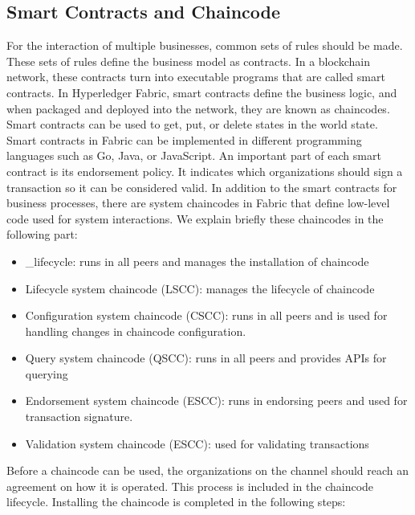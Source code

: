 \documentclass[sigconf,natbib=false]{acmart}
\begin{document}
    \subsection{Smart Contracts and Chaincode}
    For the interaction of multiple businesses, common sets of rules should be made. These sets of rules define the business model as contracts. In a blockchain network, these contracts turn into executable programs that are called smart contracts.
    In Hyperledger Fabric, smart contracts define the business logic, and when packaged and deployed into the network, they are known as chaincodes. Smart contracts can be used to get, put, or delete states in the world state. Smart contracts in Fabric can be implemented in different programming languages such as Go, Java, or JavaScript. An important part of each smart contract is its endorsement policy. It indicates which organizations should sign a transaction so it can be considered valid.
    In addition to the smart contracts for business processes, there are system chaincodes in Fabric that define low-level code used for system interactions. We explain briefly these chaincodes in the following part:
    \begin{itemize}
        \item \_lifecycle: runs in all peers and manages the installation of chaincode
        \item Lifecycle system chaincode (LSCC): manages the lifecycle of chaincode
        \item Configuration system chaincode (CSCC): runs in all peers and is used for handling changes in chaincode configuration.
        \item Query system chaincode (QSCC): runs in all peers and provides APIs for querying
        \item Endorsement system chaincode (ESCC): runs in endorsing peers and used for transaction signature.
        \item Validation system chaincode (ESCC): used for validating transactions
    \end{itemize}
    Before a chaincode can be used, the organizations on the channel should reach an agreement on how it is operated. This process is included in the chaincode lifecycle. Installing the chaincode is completed in the following steps:
\end{document}
